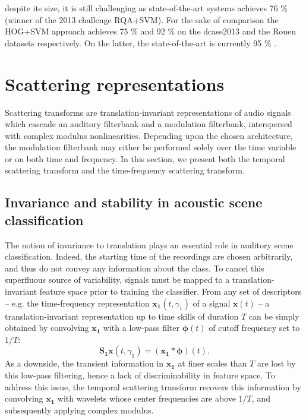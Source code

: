 \documentclass[journal]{IEEEtran}
\makeatletter
\newcommand*{\eg}{e.g.\@\xspace}
\makeatother
\begin{document}
despite its size, it is still challenging as state-of-the-art systems achieves 76 \% \cite{6701890} (winner of the 2013 challenge RQA+SVM). For the sake of comparison the HOG+SVM approach \cite{rakotomamonjy2015histogram} achieves 75 \% and 92 \% on the dcase2013 and the Rouen datasets respectively. On the latter, the state-of-the-art is currently 95 \% \cite{bisot2016acoustic}.

\section{Scattering representations}
Scattering transforms are translation-invariant representations of audio signals which cascade an auditory filterbank and a modulation filterbank, interspersed with complex modulus nonlinearities.
Depending upon the chosen architecture, the modulation filterbank may either be performed solely over the time variable or on both time and frequency.
In this section, we present both the temporal scattering transform and the time-frequency scattering transform.

\subsection{Invariance and stability in acoustic scene classification}
The notion of invariance to translation plays an essential role in auditory scene classification.
Indeed, the starting time of the recordings are chosen arbitrarily, and thus do not convey any information about the class.
To cancel this superfluous source of variability, signals must be mapped to a translation-invariant feature space prior to training the classifier.
From any set of descriptors -- \eg the time-frequency representation $\boldsymbol{x_1}(t,\gamma_1)$ of  a signal $\boldsymbol{x}(t)$ --
a translation-invariant representation up to time skills of duration $T$ can be simply obtained
by convolving $\boldsymbol{x_1}$ with a low-pass filter $\boldsymbol{\phi}(t)$ of cutoff frequency
set to $1/T$:
\begin{equation}
\mathbf{S_1}\boldsymbol{x}(t, \gamma_1) = (\boldsymbol{x_1} \ast \boldsymbol{\phi}) (t).
\end{equation}
As a downside, the transient information in $\boldsymbol{x_1}$ at finer scales than $T$ are lost by this low-pass filtering, hence a lack of discriminability in feature space.
To address this issue, the temporal scattering transform recovers this information by convolving $\boldsymbol{x_1}$ with wavelets whose center frequencies are above $1/T$, and subsequently applying complex modulus.
\end{document}
